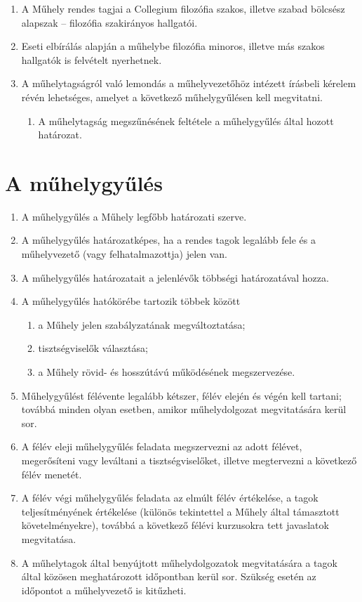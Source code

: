 \documentclass{../styles/rulebook}
\begin{document}
\begin{enumerate}
	\item  A Műhely rendes tagjai a Collegium filozófia szakos, illetve szabad bölcsész
	alapszak – filozófia szakirányos hallgatói.
	\item Eseti elbírálás alapján a műhelybe filozófia minoros, illetve más szakos
	hallgatók is felvételt nyerhetnek.
	\item A műhelytagságról való lemondás a műhelyvezetőhöz intézett írásbeli kérelem
	révén lehetséges, amelyet a következő műhelygyűlésen kell megvitatni.
	\begin{enumerate}
		\item  A műhelytagság megszűnésének feltétele a műhelygyűlés által hozott határozat.
	\end{enumerate}
\end{enumerate}


\section{A műhelygyűlés}

\begin{enumerate}
	\item A műhelygyűlés a Műhely legfőbb határozati szerve.
	\item A műhelygyűlés határozatképes, ha a rendes tagok legalább fele és a
	műhelyvezető (vagy felhatalmazottja) jelen van.
	\item A műhelygyűlés határozatait a
	jelenlévők többségi határozatával hozza.
	\item A műhelygyűlés hatókörébe tartozik többek között 
	\begin{enumerate}
		\item a Műhely jelen
		szabályzatának megváltoztatása; \item tisztségviselők választása; 
		\item a Műhely rövid- és hosszútávú működésének megszervezése.
	\end{enumerate}
	\item Műhelygyűlést félévente legalább kétszer, félév elején és végén kell tartani;
	továbbá minden olyan esetben, amikor műhelydolgozat megvitatására kerül sor.
	\item A félév eleji műhelygyűlés feladata megszervezni az adott félévet, megerősíteni
	vagy leváltani a tisztségviselőket, illetve megtervezni a következő félév menetét.
	\item A félév végi műhelygyűlés feladata az elmúlt félév értékelése, a tagok
	teljesítményének értékelése (különös tekintettel a Műhely által támasztott
	követelményekre), továbbá a következő félévi kurzusokra tett javaslatok
	megvitatása.
	\item A műhelytagok által benyújtott műhelydolgozatok megvitatására a tagok által
	közösen meghatározott időpontban kerül sor. Szükség esetén az időpontot a
	műhelyvezető is kitűzheti.
\end{enumerate}
\end{document}
